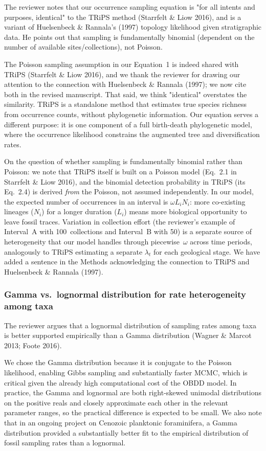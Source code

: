 \documentclass[11pt]{article}
\newcommand{\response}[1]{\noindent\textcolor{resp}{#1}\medskip}
\begin{document}
The reviewer notes that our occurrence sampling equation is "for all intents and purposes, identical" to the TRiPS method (Starrfelt \& Liow 2016), and is a variant of Huelsenbeck \& Rannala's (1997) topology likelihood given stratigraphic data. He points out that sampling is fundamentally binomial (dependent on the number of available sites/collections), not Poisson.

\response{The Poisson sampling assumption in our Equation~1 is indeed shared with TRiPS (Starrfelt \& Liow 2016), and we thank the reviewer for drawing our attention to the connection with Huelsenbeck \& Rannala (1997); we now cite both in the revised manuscript. That said, we think "identical" overstates the similarity. TRiPS is a standalone method that estimates true species richness from occurrence counts, without phylogenetic information. Our equation serves a different purpose: it is one component of a full birth-death phylogenetic model, where the occurrence likelihood constrains the augmented tree and diversification rates.}

\response{On the question of whether sampling is fundamentally binomial rather than Poisson: we note that TRiPS itself is built on a Poisson model (Eq.~2.1 in Starrfelt \& Liow 2016), and the binomial detection probability in TRiPS (its Eq.~2.4) is derived \emph{from} the Poisson, not assumed independently. In our model, the expected number of occurrences in an interval is $\omega L_i N_i$: more co-existing lineages ($N_i$) for a longer duration ($L_i$) means more biological opportunity to leave fossil traces. Variation in collection effort (the reviewer's example of Interval~A with 100~collections and Interval~B with 50) is a separate source of heterogeneity that our model handles through piecewise~$\omega$ across time periods, analogously to TRiPS estimating a separate $\lambda_t$ for each geological stage. We have added a sentence in the Methods acknowledging the connection to TRiPS and Huelsenbeck \& Rannala (1997).}

\subsubsection*{Gamma vs.\ lognormal distribution for rate heterogeneity among taxa}

The reviewer argues that a lognormal distribution of sampling rates among taxa is better supported empirically than a Gamma distribution (Wagner \& Marcot 2013; Foote 2016).

\response{We chose the Gamma distribution because it is conjugate to the Poisson likelihood, enabling Gibbs sampling and substantially faster MCMC, which is critical given the already high computational cost of the OBDD model. In practice, the Gamma and lognormal are both right-skewed unimodal distributions on the positive reals and closely approximate each other in the relevant parameter ranges, so the practical difference is expected to be small. We also note that in an ongoing project on Cenozoic planktonic foraminifera, a Gamma distribution provided a substantially better fit to the empirical distribution of fossil sampling rates than a lognormal.}
\end{document}
